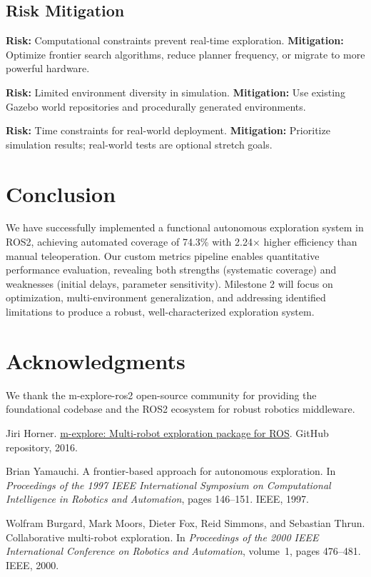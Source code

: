 \documentclass[conference]{IEEEtran}
\begin{document}
\subsection{Risk Mitigation}

\textbf{Risk:} Computational constraints prevent real-time exploration. \textbf{Mitigation:} Optimize frontier search algorithms, reduce planner frequency, or migrate to more powerful hardware.

\textbf{Risk:} Limited environment diversity in simulation. \textbf{Mitigation:} Use existing Gazebo world repositories and procedurally generated environments.

\textbf{Risk:} Time constraints for real-world deployment. \textbf{Mitigation:} Prioritize simulation results; real-world tests are optional stretch goals.

\section{Conclusion}

We have successfully implemented a functional autonomous exploration system in ROS2, achieving automated coverage of 74.3\% with 2.24$\times$ higher efficiency than manual teleoperation. Our custom metrics pipeline enables quantitative performance evaluation, revealing both strengths (systematic coverage) and weaknesses (initial delays, parameter sensitivity). Milestone 2 will focus on optimization, multi-environment generalization, and addressing identified limitations to produce a robust, well-characterized exploration system.

\section*{Acknowledgments}

We thank the m-explore-ros2 open-source community for providing the foundational codebase and the ROS2 ecosystem for robust robotics middleware.


\begin{thebibliography}{1}

Jiri Horner.
\newblock \href{https://github.com/hrnr/m-explore}{m-explore: Multi-robot exploration package for ROS}.
\newblock GitHub repository, 2016.

Brian Yamauchi.
\newblock A frontier-based approach for autonomous exploration.
\newblock In \emph{Proceedings of the 1997 IEEE International Symposium on Computational Intelligence in Robotics and Automation}, pages 146--151. IEEE, 1997.

Wolfram Burgard, Mark Moors, Dieter Fox, Reid Simmons, and Sebastian Thrun.
\newblock Collaborative multi-robot exploration.
\newblock In \emph{Proceedings of the 2000 IEEE International Conference on Robotics and Automation}, volume~1, pages 476--481. IEEE, 2000.

\end{thebibliography}
\end{document}
